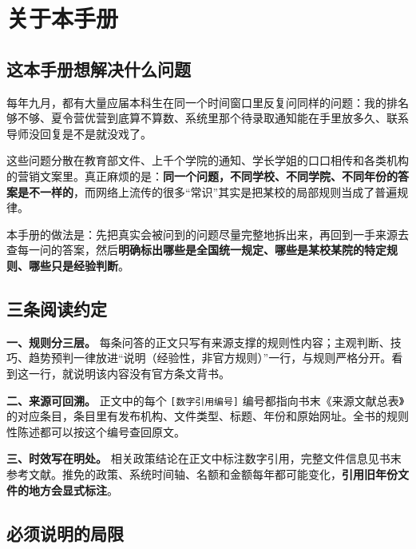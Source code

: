 \chapter*{关于本手册}

\section*{这本手册想解决什么问题}

每年九月，都有大量应届本科生在同一个时间窗口里反复问同样的问题：我的排名够不够、夏令营优营到底算不算数、系统里那个待录取通知能在手里放多久、联系导师没回复是不是就没戏了。

这些问题分散在教育部文件、上千个学院的通知、学长学姐的口口相传和各类机构的营销文案里。真正麻烦的是：\textbf{同一个问题，不同学校、不同学院、不同年份的答案是不一样的}，而网络上流传的很多“常识”其实是把某校的局部规则当成了普遍规律。

本手册的做法是：先把真实会被问到的问题尽量完整地拆出来，再回到一手来源去查每一问的答案，然后\textbf{明确标出哪些是全国统一规定、哪些是某校某院的特定规则、哪些只是经验判断}。

\section*{三条阅读约定}

\begin{keybox}
\textbf{一、规则分三层。} 每条问答的正文只写有来源支撑的规则性内容；主观判断、技巧、趋势预判一律放进“说明（经验性，非官方规则）”一行，与规则严格分开。看到这一行，就说明该内容没有官方条文背书。

\textbf{二、来源可回溯。} 正文中的每个 \texttt{[数字引用编号]} 编号都指向书末《来源文献总表》的对应条目，条目里有发布机构、文件类型、标题、年份和原始网址。全书的规则性陈述都可以按这个编号查回原文。

\textbf{三、时效写在明处。} 相关政策结论在正文中标注数字引用，完整文件信息见书末参考文献。推免的政策、系统时间轴、名额和金额每年都可能变化，\textbf{引用旧年份文件的地方会显式标注}。
\end{keybox}

\section*{必须说明的局限}

